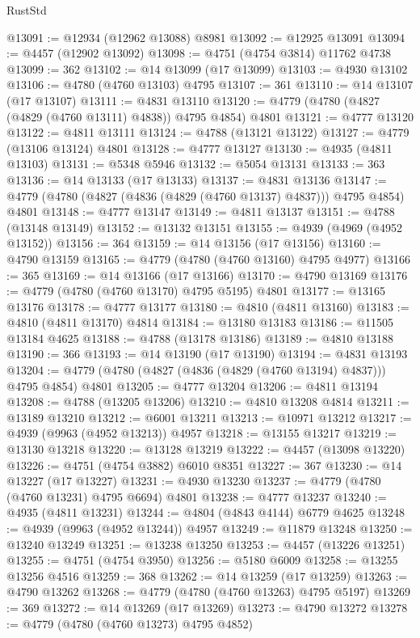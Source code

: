 \begin{lexlean}{RustStd}
\begin{coremodule}
@13091 := @12934 (@12962 @13088) @8981
@13092 := @12925 @13091
@13094 := @4457 (@12902 @13092)
@13098 := @4751 (@4754 @3814) @11762 @4738
@13099 := 362
@13102 := @14 @13099 (@17 @13099)
@13103 := @4930 @13102
@13106 := @4780 (@4760 @13103) @4795
@13107 := 361
@13110 := @14 @13107 (@17 @13107)
@13111 := @4831 @13110
@13120 := @4779 (@4780 (@4827 (@4829 (@4760 @13111) @4838)) @4795 @4854) @4801
@13121 := @4777 @13120
@13122 := @4811 @13111
@13124 := @4788 (@13121 @13122)
@13127 := @4779 (@13106 @13124) @4801
@13128 := @4777 @13127
@13130 := @4935 (@4811 @13103)
@13131 := @5348 @5946
@13132 := @5054 @13131
@13133 := 363
@13136 := @14 @13133 (@17 @13133)
@13137 := @4831 @13136
@13147 := @4779 (@4780 (@4827 (@4836 (@4829 (@4760 @13137) @4837))) @4795 @4854) @4801
@13148 := @4777 @13147
@13149 := @4811 @13137
@13151 := @4788 (@13148 @13149)
@13152 := @13132 @13151
@13155 := @4939 (@4969 (@4952 @13152))
@13156 := 364
@13159 := @14 @13156 (@17 @13156)
@13160 := @4790 @13159
@13165 := @4779 (@4780 (@4760 @13160) @4795 @4977)
@13166 := 365
@13169 := @14 @13166 (@17 @13166)
@13170 := @4790 @13169
@13176 := @4779 (@4780 (@4760 @13170) @4795 @5195) @4801
@13177 := @13165 @13176
@13178 := @4777 @13177
@13180 := @4810 (@4811 @13160)
@13183 := @4810 (@4811 @13170) @4814
@13184 := @13180 @13183
@13186 := @11505 @13184 @4625
@13188 := @4788 (@13178 @13186)
@13189 := @4810 @13188
@13190 := 366
@13193 := @14 @13190 (@17 @13190)
@13194 := @4831 @13193
@13204 := @4779 (@4780 (@4827 (@4836 (@4829 (@4760 @13194) @4837))) @4795 @4854) @4801
@13205 := @4777 @13204
@13206 := @4811 @13194
@13208 := @4788 (@13205 @13206)
@13210 := @4810 @13208 @4814
@13211 := @13189 @13210
@13212 := @6001 @13211
@13213 := @10971 @13212
@13217 := @4939 (@9963 (@4952 @13213)) @4957
@13218 := @13155 @13217
@13219 := @13130 @13218
@13220 := @13128 @13219
@13222 := @4457 (@13098 @13220)
@13226 := @4751 (@4754 @3882) @6010 @8351
@13227 := 367
@13230 := @14 @13227 (@17 @13227)
@13231 := @4930 @13230
@13237 := @4779 (@4780 (@4760 @13231) @4795 @6694) @4801
@13238 := @4777 @13237
@13240 := @4935 (@4811 @13231)
@13244 := @4804 (@4843 @4144) @6779 @4625
@13248 := @4939 (@9963 (@4952 @13244)) @4957
@13249 := @11879 @13248
@13250 := @13240 @13249
@13251 := @13238 @13250
@13253 := @4457 (@13226 @13251)
@13255 := @4751 (@4754 @3950)
@13256 := @5180 @6009
@13258 := @13255 @13256 @4516
@13259 := 368
@13262 := @14 @13259 (@17 @13259)
@13263 := @4790 @13262
@13268 := @4779 (@4780 (@4760 @13263) @4795 @5197)
@13269 := 369
@13272 := @14 @13269 (@17 @13269)
@13273 := @4790 @13272
@13278 := @4779 (@4780 (@4760 @13273) @4795 @4852)

\end{coremodule}
\end{lexlean}
